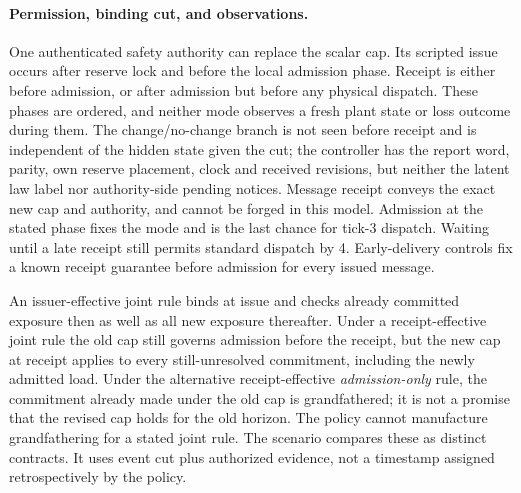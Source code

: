 \documentclass[11pt]{article}
\begin{document}
\paragraph{Permission, binding cut, and observations.}
One authenticated safety authority can replace the scalar cap. Its scripted issue occurs after reserve lock and before the local admission phase. Receipt is either before admission, or after admission but before any physical dispatch. These phases are ordered, and neither mode observes a fresh plant state or loss outcome during them. The change/no-change branch is not seen before receipt and is independent of the hidden state given the cut; the controller has the report word, parity, own reserve placement, clock and received revisions, but neither the latent law label nor authority-side pending notices. Message receipt conveys the exact new cap and authority, and cannot be forged in this model. Admission at the stated phase fixes the mode and is the last chance for tick-3 dispatch. Waiting until a late receipt still permits standard dispatch by 4. Early-delivery controls fix a known receipt guarantee before admission for every issued message.

An issuer-effective joint rule binds at issue and checks already committed exposure then as well as all new exposure thereafter. Under a receipt-effective joint rule the old cap still governs admission before the receipt, but the new cap at receipt applies to every still-unresolved commitment, including the newly admitted load. Under the alternative receipt-effective \emph{admission-only} rule, the commitment already made under the old cap is grandfathered; it is not a promise that the revised cap holds for the old horizon. The policy cannot manufacture grandfathering for a stated joint rule. The scenario compares these as distinct contracts. It uses event cut plus authorized evidence, not a timestamp assigned retrospectively by the policy.
\end{document}
